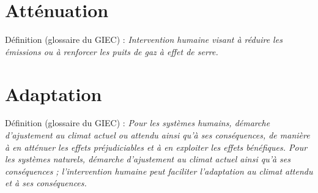 \section{Atténuation}
Définition (glossaire du GIEC) : \textit{Intervention humaine visant à réduire les émissions ou à renforcer les puits de gaz à effet de serre.}
\section{Adaptation}
Définition (glossaire du GIEC) : \textit{Pour les systèmes humains, démarche d’ajustement au climat actuel ou attendu ainsi qu’à ses conséquences, de manière à en atténuer les effets préjudiciables et à en exploiter les effets bénéfiques. Pour les systèmes naturels, démarche d’ajustement au climat actuel ainsi qu’à ses conséquences ; l’intervention humaine peut faciliter l’adaptation au climat attendu et à ses conséquences.}
